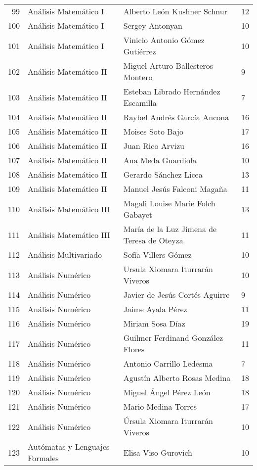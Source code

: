 \begin{table}[ht]
\begin{tabular}{rlll}
  99 & Análisis Matemático I & Alberto León Kushner Schnur & 12 \\ 
  100 & Análisis Matemático I & Sergey Antonyan & 10 \\ 
  101 & Análisis Matemático I & Vinicio Antonio Gómez Gutiérrez & 10 \\ 
  102 & Análisis Matemático II & Miguel Arturo Ballesteros Montero & 9 \\ 
  103 & Análisis Matemático II & Esteban Librado Hernández Escamilla & 7 \\ 
  104 & Análisis Matemático II & Raybel Andrés García Ancona & 16 \\ 
  105 & Análisis Matemático II & Moises Soto Bajo & 17 \\ 
  106 & Análisis Matemático II & Juan Rico Arvizu & 16 \\ 
  107 & Análisis Matemático II & Ana Meda Guardiola & 10 \\ 
  108 & Análisis Matemático II & Gerardo Sánchez Licea & 13 \\ 
  109 & Análisis Matemático II & Manuel Jesús Falconi Magaña & 11 \\ 
  110 & Análisis Matemático III & Magali Louise Marie Folch Gabayet & 13 \\ 
  111 & Análisis Matemático III & María de la Luz Jimena de Teresa de Oteyza & 11 \\ 
  112 & Análisis Multivariado & Sofía Villers Gómez & 10 \\ 
  113 & Análisis Numérico & Ursula Xiomara Iturrarán Viveros & 10 \\ 
  114 & Análisis Numérico & Javier de Jesús Cortés Aguirre & 9 \\ 
  115 & Análisis Numérico & Jaime Ayala Pérez & 11 \\ 
  116 & Análisis Numérico & Miriam Sosa Díaz & 19 \\ 
  117 & Análisis Numérico & Guilmer Ferdinand González Flores & 11 \\ 
  118 & Análisis Numérico & Antonio Carrillo Ledesma & 7 \\ 
  119 & Análisis Numérico & Agustín Alberto Rosas Medina & 18 \\ 
  120 & Análisis Numérico & Miguel Ángel Pérez León & 18 \\ 
  121 & Análisis Numérico & Mario Medina Torres & 17 \\ 
  122 & Análisis Numérico & Úrsula Xiomara Iturrarán Viveros & 10 \\ 
  123 & Autómatas y Lenguajes Formales & Elisa Viso Gurovich & 10 \\ 

\end{tabular}
\end{table}

